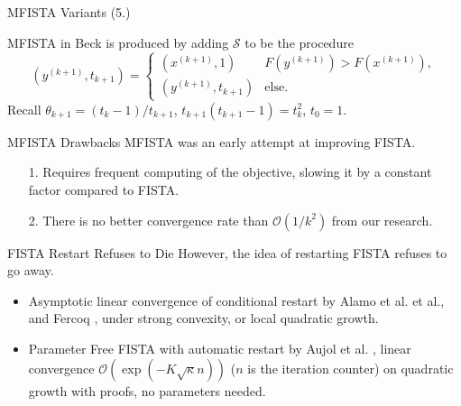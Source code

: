 \documentclass[11pt]{beamer}
\theoremstyle{definition}
\begin{document}
    \begin{frame}{MFISTA Variants (5.)}
        \begin{algorithm}[H]
            \begin{tiny}
                \begin{algorithmic}[1]
                    \ENDFOR
                \end{algorithmic}
                \caption{Generic FISTA}    
            \end{tiny}
        \end{algorithm}
        MFISTA in Beck \cite{beck_fast_2009} is produced by adding $\mathcal S$ to be the procedure
        \[
            (y^{(k + 1)}, t_{k + 1}) = \begin{cases}
                (x^{(k + 1)}, 1) & F(y^{(k + 1)}) > F(x^{(k + 1)}),
                \\
                (y^{(k + 1)}, t_{k + 1}) & \text{else}. 
            \end{cases}
        \]
        Recall 
        $\theta_{k + 1} = (t_k - 1)/t_{k + 1}$, $t_{k + 1}(t_{k + 1} - 1) = t_{k}^2$, $t_0 = 1$. 
    \end{frame}
    \begin{frame}{MFISTA Drawbacks}
        MFISTA was an early attempt at improving FISTA. 
        \begin{itemize}
            \item [1.] Requires frequent computing of the objective, slowing it by a constant factor compared to FISTA. 
            \item [2.] There is no better convergence rate than $\mathcal O(1/k^2)$ from our research. 
        \end{itemize}
    \end{frame}
    \begin{frame}{FISTA Restart Refuses to Die}
        However, the idea of restarting FISTA refuses to go away. 
        \\
        \begin{itemize}
            \item Asymptotic linear convergence of conditional restart by Alamo et al. \cite{alamo_restart_2019}\cite{alamo_gradient_2019} et al., and Fercoq  \cite{fercoq_adaptive_2019}, under strong convexity, or local quadratic growth. 
            \item Parameter Free FISTA with automatic restart by Aujol et al. \cite{aujol_parameter-free_2023}, linear convergence $\mathcal O(\exp(-K\sqrt{\kappa}n))$ ($n$ is the iteration counter) on quadratic growth with proofs, no parameters needed.
        \end{itemize}
    \end{frame}
\end{document}
